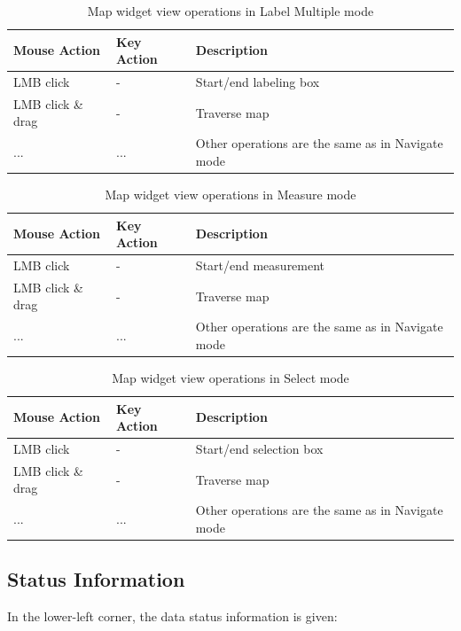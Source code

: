 \begin{table}[H]
  \center
  \begin{tabular}{ | l | l | l |}
    \hline
    \textbf{Mouse Action} & \textbf{Key Action} &  \textbf{Description} \\ \hline
    LMB click & - & Start/end labeling box \\ \hline
    LMB click \& drag & - & Traverse map \\ \hline
    ... & ... & Other operations are the same as in Navigate mode \\ \hline  
    \end{tabular}
  \caption{Map widget view operations in Label Multiple mode}
\end{table}

\begin{table}[H]
  \center
  \begin{tabular}{ | l | l | l |}
    \hline
    \textbf{Mouse Action} & \textbf{Key Action} &  \textbf{Description} \\ \hline
    LMB click & - & Start/end measurement \\ \hline
    LMB click \& drag & - & Traverse map \\ \hline
    ... & ... & Other operations are the same as in Navigate mode \\ \hline  
    \end{tabular}
  \caption{Map widget view operations in Measure mode}
\end{table}

\begin{table}[H]
  \center
  \begin{tabular}{ | l | l | l |}
    \hline
    \textbf{Mouse Action} & \textbf{Key Action} &  \textbf{Description} \\ \hline
    LMB click & - & Start/end selection box \\ \hline
    LMB click \& drag & - & Traverse map \\ \hline
    ... & ... & Other operations are the same as in Navigate mode \\ \hline  
    \end{tabular}
  \caption{Map widget view operations in Select mode}
\end{table}

\subsection{Status Information}

In the lower-left corner, the data status information is given:

